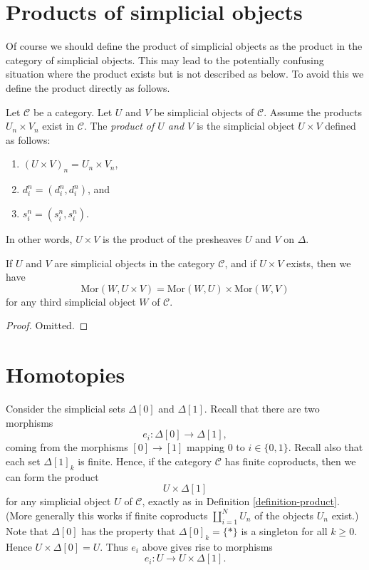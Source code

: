 \section{Products of simplicial objects}
\label{section-products}

\noindent
Of course we should define the product of simplicial objects
as the product in the category of simplicial objects. This
may lead to the potentially confusing situation where the product exists
but is not described as below. To avoid this we define the product
directly as follows.

\begin{definition}
\label{definition-product}
Let $\mathcal{C}$ be a category.
Let $U$ and $V$ be simplicial objects of $\mathcal{C}$.
Assume the products $U_n \times V_n$ exist in $\mathcal{C}$.
The {\it product of $U$ and $V$} is the simplicial object
$U\times V$ defined as follows:
\begin{enumerate}
\item $(U \times V)_n = U_n \times V_n$,
\item $d^n_i = (d^n_i, d^n_i)$, and
\item $s^n_i = (s^n_i, s^n_i)$.
\end{enumerate}
In other words, $U\times V$ is the product of the presheaves
$U$ and $V$ on $\Delta$.
\end{definition}

\begin{lemma}
\label{lemma-product}
If $U$ and $V$ are simplicial objects in the category $\mathcal{C}$,
and if $U\times V$ exists, then we have
$$
\text{Mor}(W, U\times V) = 
\text{Mor}(W, U) \times
\text{Mor}(W, V)
$$
for any third simplicial object $W$ of $\mathcal{C}$.
\end{lemma}

\begin{proof}
Omitted.
\end{proof}


\section{Homotopies}
\label{section-homotopy}

\noindent
Consider the simplicial sets $\Delta[0]$ and $\Delta[1]$.
Recall that there are two morphisms
$$
e_i : \Delta[0] \longrightarrow \Delta[1],
$$
coming from the morphisms $[0] \to [1]$ mapping 
$0$ to $i \in \{0, 1\}$. Recall also that each
set $\Delta[1]_k$ is finite. Hence, if the category
$\mathcal{C}$ has finite coproducts, then we can
form the product
$$
U \times \Delta[1]
$$
for any simplicial object $U$ of $\mathcal{C}$, exactly
as in Definition \ref{definition-product}. (More generally
this works if finite coproducts $\coprod_{i=1}^N U_n$
of the objects $U_n$ exist.)
Note that $\Delta[0]$ has the property that $\Delta[0]_k = \{*\}$
is a singleton for all $k \geq 0$. Hence $U \times \Delta[0]
= U$. Thus $e_i$ above gives rise to morphisms
$$
e_i : U \to U \times \Delta[1].
$$


